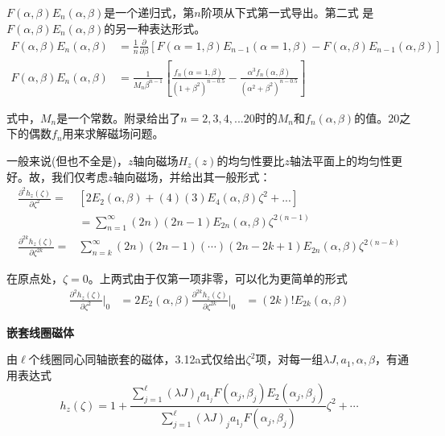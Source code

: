 $F(\alpha,\beta)E_{n}(\alpha,\beta)$是一个递归式，第$n$阶项从下式第一式导出。第二式
是$F(\alpha,\beta) E_{n}(\alpha,\beta)$的另一种表达形式。
\begin{subequations}
	\begin{align}
F(\alpha,\beta)E_{n}(\alpha,\beta)&=\frac{1}{n} \frac{\partial}{\partial \beta}\left[F(\alpha=1,\beta)E_{n-1}(\alpha=1,\beta)-F(\alpha,\beta)E_{n-1}(\alpha,\beta)\right]\\
F(\alpha,\beta) E_{n}(\alpha,\beta)&=\frac{1}{M_n \beta^{n-1}}\left[\frac{f_n(\alpha=1,\beta)}{(1+\beta^2)^{n-0.5}}-\frac{\alpha^3 f_n(\alpha,\beta)}{(\alpha^2+\beta^2)^{n-0.5}}\right]
\end{align}
\end{subequations}

式中，$M_n$是一个常数。附录给出了$n=2,3,4,...20$时的$M_n$和$f_n(\alpha,\beta)$的值。$20$之下的偶数$f_n$用来求解磁场问题。

一般来说(但也不全是)，$z$轴向磁场$H_z(z)$的均匀性要比$z$轴法平面上的均匀性更好。故，我们仅考虑$z$轴向磁场，并给出其一般形式：
\begin{subequations}
	\begin{align}
\frac{\partial^2 h_z(\zeta)}{\partial \zeta^2}=&[2 E_2(\alpha,\beta)+(4)(3)E_4(\alpha,\beta)\zeta^2+...]\nonumber\\
&=\sum_{n=1}^{\infty} (2n)(2n-1)E_{2n}(\alpha,\beta)\zeta^{2(n-1)}\\
 \frac{\partial^{2k} h_z(\zeta)}{\partial \zeta^{2k}}=&\sum_{n=k}^{\infty} (2n)(2n-1)(\cdots)(2n-2k+1)E_{2n}(\alpha,\beta)\zeta^{2(n-k)}
	\end{align}
\end{subequations}

在原点处，$\zeta=0$。上两式由于仅第一项非零，可以化为更简单的形式
\begin{subequations}
	\begin{align}
\frac{\partial^2 h_z(\zeta)}{\partial \zeta^2}\bigg|_{0}&=2 E_{2}(\alpha,\beta)
\frac{\partial^{2k} h_z(\zeta)}{\partial \zeta^{2k}}\bigg|_{0}&=(2k)! E_{2k}(\alpha,\beta)
	\end{align}
\end{subequations}

\textbf{嵌套线圈磁体}

由$\ell$个线圈同心同轴嵌套的磁体，3.12a式仅给出$\zeta^2$项，对每一组$\lambda J, a_1, \alpha, \beta$，有通用表达式
\begin{equation}
  h_z(\zeta)=1+\frac{\sum_{j=1}^{\ell} (\lambda J)_l a_{1_j}F(\alpha_j,\beta_j)E_2(\alpha_j,\beta_j)}{\sum_{j=1}^{\ell}(\lambda J)_j a_{1_j} F(\alpha_j,\beta_j)}\zeta^2+\cdots
\end{equation}

